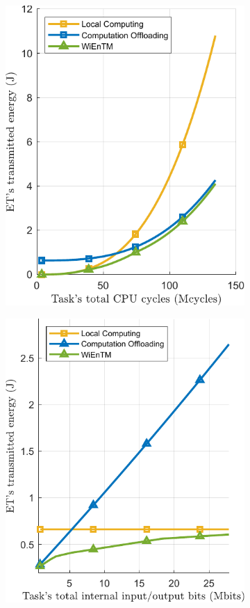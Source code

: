 \documentclass[12pt,draftclsnofoot,onecolumn]{IEEEtran}
\begin{document}
\begin{figure}
	\centering
	\begin{subfigure}[b]{.24\textwidth}
		\centering
		\includegraphics[height=1.2\linewidth]{simulation3_a.pdf}
		\caption{} \label{fig:9a}
	\end{subfigure}
	\begin{subfigure}[b]{.24\textwidth}
		\centering
		\includegraphics[height=1.2\linewidth]{simulation3_b.pdf}

\end{subfigure}
\end{figure}
\end{document}
